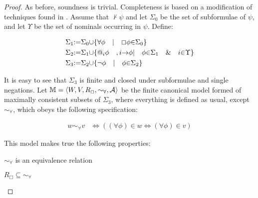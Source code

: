 \begin{proof}
  As before, soundness is trivial.  Completeness is based on a modification
  of techniques found in {\cite[chapter 5]{boolos_logic_1995}}.  Assume
  that $\nvdash \psi$ and let $\Sigma_0$ be the set of subformulae of $\psi$,
  and let $\Upsilon$ be the set of nominals occurring in $\psi$.  Define:
  
  \begin{align*}
    {\Sigma}_1 &
    {\assign}{\Sigma}_0{\cup}\{{\forall}{\phi}{\hspace{1em}}|{\hspace{1em}}\Box{\phi}{\in}{\Sigma}_0\}\\
    {\Sigma}_2 &
    {\assign}{\Sigma}_1{\cup}\{\text{@}_i{\phi}{\hspace{1em}},i{\rightarrow}{\phi}|{\hspace{1em}}{\phi}{\in}{\Sigma}_1{\hspace{1em}}\&{\hspace{1em}}i{\in}{\Upsilon}\}\\
    {\Sigma}_3 &
    {\assign}{\Sigma}_2{\cup}\{{\neg}{\phi}{\hspace{1em}}|{\hspace{1em}}{\phi}{\in}{\Sigma}_2\}
  \end{align*}
  
  It is easy to see that $\Sigma_3$ is finite and closed under subformulae and
  single negations. Let $\mathbbm{M}= \langle W, V, R_{\Box}, \sim_{\forall},
  \mathcal{A} \rangle$ be the finite canonical model formed of maximally
  consistent subsets of $\Sigma_3$, where everything is defined as usual,
  except $\sim_{\forall}$, which obeys the following specification:
  
  \begin{align*}
    w {\sim}_{{\forall}}v & {\Longleftrightarrow}(({\forall}{\phi}){\in}w
    {\Longleftrightarrow}({\forall}{\phi}){\in}v)
  \end{align*}
  
  This model makes true the following properties:
  \begin{enumerateroman}
    \item $\sim_{\forall}$ is an equivalence relation
    
    \item $R_{\Box} \subseteq \sim_{\forall}$
    

\end{enumerateroman}
\end{proof}
